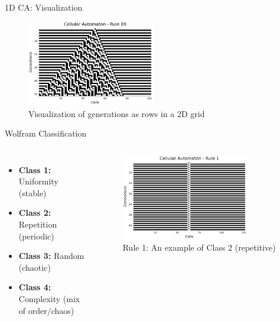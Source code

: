 \begin{frame}{1D CA: Visualization}
    \begin{figure}
        \centering
        \includegraphics[width=0.5\textwidth]{../paper/figures/carule89}
        \caption{Visualization of generations as rows in a 2D grid}

    \end{figure}

\end{frame}


\begin{frame}{Wolfram Classification}
    \begin{columns}
        \begin{itemize}
            \item \textbf{Class 1:} Uniformity (stable)
            \item \textbf{Class 2:} Repetition (periodic)
            \item \textbf{Class 3:} Random (chaotic)
            \item \textbf{Class 4:} Complexity (mix of order/chaos)
        \end{itemize}
        \begin{figure}
            \centering
            \includegraphics[width=0.8\textwidth]{../paper/figures/rule1.png}
            \caption{Rule 1: An example of Class 2 (repetitive)}
        \end{figure}
    \end{columns}
\end{frame}


